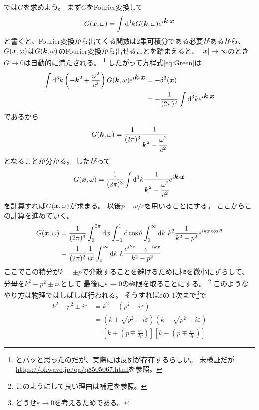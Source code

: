 \documentclass[a4paper, 10pt]{jsarticle}
\theoremstyle{definition}
\def\vec#1{\mbox{\boldmath $#1$}}
\newcommand{\ddif}{{\rm d}}
\begin{document}
では$G$を求めよう。
まず$G$をFourier変換して
\begin{align}
	G(\vec{x}, \omega) =
	\int \ddif^3 k G(\vec{k}, \omega) e^{i \vec{k} \cdot \vec{x}}
\end{align}
と書くと、Fourier変換から出てくる関数は2乗可積分である必要があるから、
$G(\vec{x}, \omega)$は$G(\vec{k}, \omega)$のFourier変換から出せることを踏まえると、
$|\vec{x}| \to \infty$のとき$G \to 0$は自動的に満たされる。
\footnote{とパッと思ったのだが、実際には反例が存在するらしい。
未検証だが\url{https://okwave.jp/qa/q8505067.html}を参照。}
したがって方程式\eqref{eq:Green}は
\begin{align}
	\int \ddif^3 k
	\left( -\vec{k}^2 + \frac{\omega^2}{c^2} \right) G(\vec{k}, \omega)
	e^{i \vec{k} \cdot \vec{x}}
	&= -\delta^3(\vec{x}) \\
	&= -\frac{1}{(2\pi)^3} \int \ddif^3 k e^{i\vec{k} \cdot \vec{x}}
\end{align}
であるから
\begin{align}
	G(\vec{k}, \omega)
	= \frac{1}{(2\pi)^3} \cfrac{1}{\vec{k}^2 - \cfrac{\omega^2}{c^2}}
\end{align}
となることが分かる。
したがって
\begin{align}
	G(\vec{x}, \omega) = \frac{1}{(2\pi)^3} \int \ddif^3 k
	\cfrac{1}{\vec{k}^2 - \cfrac{\omega^2}{c^2}} e^{i \vec{k} \cdot \vec{x}}
\end{align}
を計算すれば$G(\vec{x}, \omega)$が求まる。
以後$p = \omega/c$を用いることにする。
ここからこの計算を進めていく。
\begin{align}
	G(\vec{x}, \omega) &= \frac{1}{(2\pi)^3}
	\int_{0}^{2\pi} \ddif \phi \int_{-1}^{1} \ddif \cos \theta
	\int_{0}^{\infty} \ddif k \
	k^2 \frac{1}{k^2 - p^2} e^{ikx \cos \theta} \\
	&= \frac{1}{(2\pi)^2} \frac{1}{ix} \int_{0}^{\infty} \ddif k \
	k \frac{e^{ikx} - e^{-ikx}}{k^2 - p^2}
\end{align}
ここでこの積分が$k=\pm p$で発散することを避けるために極を微小にずらして、
分母を$k^2 - p^2 \pm i\varepsilon$として
最後に$\varepsilon \to 0$の極限を取ることにする。
\footnote{このようにして良い理由は補足を参照。}
このようなやり方は物理ではしばしば行われる。
そうすれば$\varepsilon$の
1次まで\footnote{どうせ$\varepsilon \to 0$を考えるためである。}で
\begin{align}
	k^2 - p^2 \pm i\varepsilon &= k^2 - ( p^2 \mp i\varepsilon ) \\
	&= \left( k + \sqrt{p^2 \mp i\varepsilon} \right)
	\left( k - \sqrt{p^2 - i\varepsilon} \right) \\
	&= \left[ k + \left(p \mp \frac{i\varepsilon}{2p}\right) \right]
	\left[ k - \left(p \mp \frac{i\varepsilon}{2p}\right) \right]
\end{align}
\end{document}
